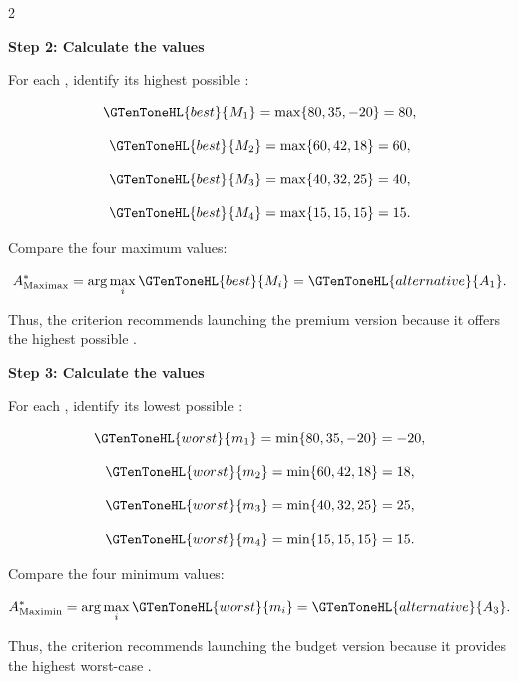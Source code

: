 	\begin{multicols}{2}
		\vspace{0pt}
		
		\textbf{Step 2: Calculate the  values}
		
		For each , identify its highest possible :
		
		\[
		\GTenToneHL{best}{M_1}
		=
		\max\{80,35,-20\}
		=
		80,
		\]
		
		\[
		\GTenToneHL{best}{M_2}
		=
		\max\{60,42,18\}
		=
		60,
		\]
		
		\[
		\GTenToneHL{best}{M_3}
		=
		\max\{40,32,25\}
		=
		40,
		\]
		
		\[
		\GTenToneHL{best}{M_4}
		=
		\max\{15,15,15\}
		=
		15.
		\]
		
		Compare the four maximum values:
		
		\[
		A^*_{\mathrm{Maximax}}
		=
		\arg\max_i \GTenToneHL{best}{M_i}
		=
		\GTenToneHL{alternative}{A_1}.
		\]
		
		Thus, the  criterion recommends launching the premium version because it offers the highest possible .
		
		\columnbreak
		
		\textbf{Step 3: Calculate the  values}
		
		For each , identify its lowest possible :
		
		\[
		\GTenToneHL{worst}{m_1}
		=
		\min\{80,35,-20\}
		=
		-20,
		\]
		
		\[
		\GTenToneHL{worst}{m_2}
		=
		\min\{60,42,18\}
		=
		18,
		\]
		
		\[
		\GTenToneHL{worst}{m_3}
		=
		\min\{40,32,25\}
		=
		25,
		\]
		
		\[
		\GTenToneHL{worst}{m_4}
		=
		\min\{15,15,15\}
		=
		15.
		\]
		
		Compare the four minimum values:
		
		\[
		A^*_{\mathrm{Maximin}}
		=
		\arg\max_i \GTenToneHL{worst}{m_i}
		=
		\GTenToneHL{alternative}{A_3}.
		\]
		
		Thus, the  criterion recommends launching the budget version because it provides the highest worst-case .
		
	\end{multicols}
	
